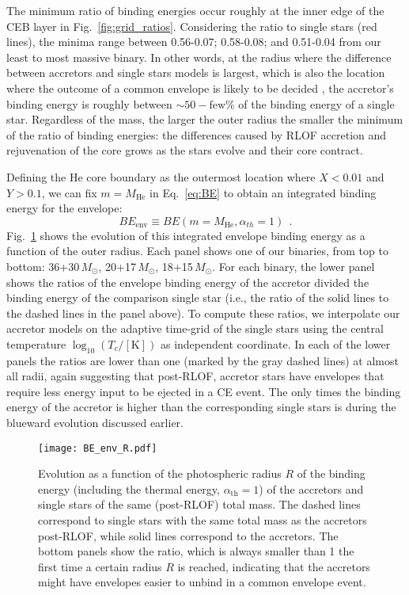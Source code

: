 \documentclass[twocolumn,twocolappendix,trackchanges]{aastex63}
\DeclareRobustCommand{\Eqref}[1]{Eq.~\ref{#1}}
\DeclareRobustCommand{\Figref}[1]{Fig.~\ref{#1}}
\begin{document}
The minimum ratio of binding energies occur roughly at the inner edge
of the CEB layer in \Figref{fig:grid_ratios}. Considering the
ratio to single stars (red lines), the minima range between 0.56-0.07;
0.58-0.08; and 0.51-0.04 from our least to most massive binary. In
other words, at the radius where the difference between accretors and
single stars models is largest, which is also the location where the
outcome of a common envelope is likely to be decided \citep[e.g.,][]{ivanova:2013}, the accretor's
binding energy is roughly between $\sim{}50-\mathrm{few}\%$ of the
binding energy of a single star. Regardless of the mass, the larger
the outer radius the smaller the minimum of the ratio of binding
energies: the differences caused by RLOF accretion and rejuvenation of
the core grows as the stars evolve and their core contract.

Defining the He core boundary as the outermost location where $X<0.01$
and $Y>0.1$, we can fix $m=M_\mathrm{He}$ in \Eqref{eq:BE} to obtain
an integrated binding energy for the envelope:
\begin{equation}
  \label{eq:BE_env}
  BE_\mathrm{env} \equiv BE(m=M_\mathrm{He}, \alpha_{th}=1) \ \ .
\end{equation}
\Figref{fig:BE_env_R} shows the evolution of this integrated envelope
binding energy as a function of the outer radius. Each panel shows one
of our binaries, from top to bottom: 36+30\,$M_\odot$,
20+17\,$M_\odot$, 18+15\,$M_\odot$.  For each binary, the
lower panel shows the ratios of the envelope binding energy of the
accretor divided the binding energy of the comparison single star
(i.e., the ratio of the solid lines to the dashed lines in the panel
above). To compute these ratios, we interpolate our accretor models
on the adaptive time-grid of the single stars using the central temperature
$\log_{10}(T_c/[\mathrm{K}])$ as independent coordinate. In each of
the lower panels the ratios are lower than one (marked by the gray
dashed lines) at almost all radii, again suggesting that post-RLOF,
accretor stars have envelopes that require less energy input to be
ejected in a CE event. The only times the binding energy of the
accretor is higher than the corresponding single stars is during the
blueward evolution discussed earlier.

\begin{figure}[tp]
  \centering
  \texttt{[image: BE\_env\_R.pdf]}
  \caption{Evolution as a function of the photospheric radius $R$ of
    the binding energy (including the thermal energy,
    $\alpha_\mathrm{th}=1$) of the accretors and single stars of the
    same (post-RLOF) total mass. The dashed lines correspond to single
    stars with the same total mass as the accretors post-RLOF, while
    solid lines correspond to the accretors. The bottom panels show
    the ratio, which is always smaller than 1 the first time a certain
    radius $R$ is reached, indicating that the accretors might have
    envelopes easier to unbind in a common envelope event.}
  \label{fig:BE_env_R}
\end{figure}
\end{document}
